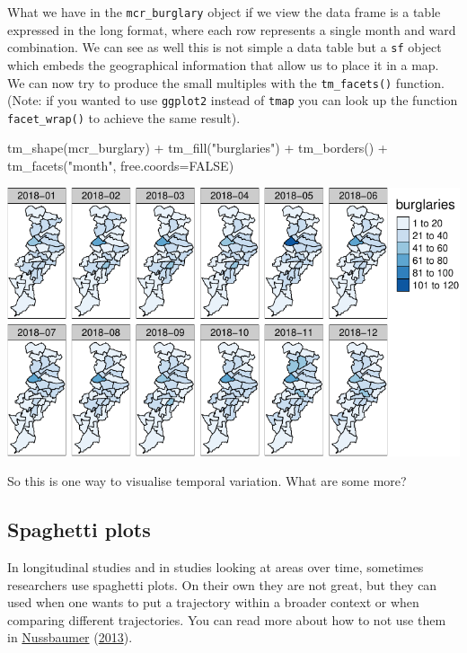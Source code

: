\documentclass[
]{book}
\makeatletter
\newenvironment{Shaded}{\begin{snugshade}}{\end{snugshade}}
\newcommand{\AttributeTok}[1]{\textcolor[rgb]{0.61,0.61,0.61}{#1}}
\newcommand{\ConstantTok}[1]{\textcolor[rgb]{0,0,0}{#1}}
\newcommand{\FunctionTok}[1]{\textcolor[rgb]{0,0,0}{#1}}
\newcommand{\NormalTok}[1]{#1}
\newcommand{\SpecialCharTok}[1]{\textcolor[rgb]{0,0,0}{#1}}
\newcommand{\StringTok}[1]{\textcolor[rgb]{0.5,0.5,0.5}{#1}}
\newenvironment{kframe}{%
\medskip{}
\setlength{\fboxsep}{.8em}
 \def\at@end@of@kframe{}%
 \ifinner\ifhmode%
  \def\at@end@of@kframe{\end{minipage}}%
  \begin{minipage}{\columnwidth}%
 \fi\fi%
 \def\FrameCommand##1{\hskip\@totalleftmargin \hskip-\fboxsep
 \colorbox{shadecolor}{##1}\hskip-\fboxsep
     \hskip-\linewidth \hskip-\@totalleftmargin \hskip\columnwidth}%
 \MakeFramed {\advance\hsize-\width
   \@totalleftmargin\z@ \linewidth\hsize
   \@setminipage}}%
 {\par\unskip\endMakeFramed%
 \at@end@of@kframe}
\renewenvironment{Shaded}{\begin{kframe}}{\end{kframe}}
\makeatother
\begin{document}
What we have in the \texttt{mcr\_burglary} object if we view the data frame is a table expressed in the long format, where each row represents a single month and ward combination. We can see as well this is not simple a data table but a \texttt{sf} object which embeds the geographical information that allow us to place it in a map. We can now try to produce the small multiples with the \texttt{tm\_facets()} function. (Note: if you wanted to use \texttt{ggplot2} instead of \texttt{tmap} you can look up the function \texttt{facet\_wrap()} to achieve the same result).

\begin{Shaded}
\begin{Highlighting}[]
\FunctionTok{tm\_shape}\NormalTok{(mcr\_burglary) }\SpecialCharTok{+} 
  \FunctionTok{tm\_fill}\NormalTok{(}\StringTok{"burglaries"}\NormalTok{) }\SpecialCharTok{+}
  \FunctionTok{tm\_borders}\NormalTok{() }\SpecialCharTok{+}
  \FunctionTok{tm\_facets}\NormalTok{(}\StringTok{"month"}\NormalTok{, }\AttributeTok{free.coords=}\ConstantTok{FALSE}\NormalTok{)}
\end{Highlighting}
\end{Shaded}

\includegraphics{crime_mapping_files/figure-latex/unnamed-chunk-180-1.pdf}

So this is one way to visualise temporal variation. What are some more?

\hypertarget{spaghetti-plots}{%
\subsection{Spaghetti plots}\label{spaghetti-plots}}

In longitudinal studies and in studies looking at areas over time, sometimes researchers use spaghetti plots. On their own they are not great, but they can used when one wants to put a trajectory within a broader context or when comparing different trajectories. You can read more about how to not use them in \protect\hyperlink{ref-Nussbaumer_2013}{Nussbaumer} (\protect\hyperlink{ref-Nussbaumer_2013}{2013}).
\end{document}
